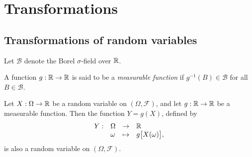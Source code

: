 \chapter{Transformations}\label{chap:transformations}
\section{Transformations of random variables}
Let $\mathcal{B}$ denote the Borel $\sigma$-field over $\mathbb{R}$.
%
%
\begin{definition}
A function $g:\mathbb{R}\to\mathbb{R}$ is said to be a \emph{measurable function} if $g^{-1}(B)\in \mathcal{B}$ for all $B\in\mathcal{B}$.
\end{definition}

%


\begin{theorem}\label{thm:gX_is_a_rv}
Let $X:\Omega\to\mathbb{R}$ be a random variable on $(\Omega,\mathcal{F})$, and let $g:\mathbb{R}\to\mathbb{R}$ be a measurable function. Then the function $Y=g(X)$, defined by
\[
\begin{array}{rlcl}
Y : 	& \Omega & \to 		& \mathbb{R} \\
	& \omega & \mapsto	& g\big[X(\omega)\big],
\end{array}
\]
is also a random variable on $(\Omega,\mathcal{F})$.
\end{theorem}


